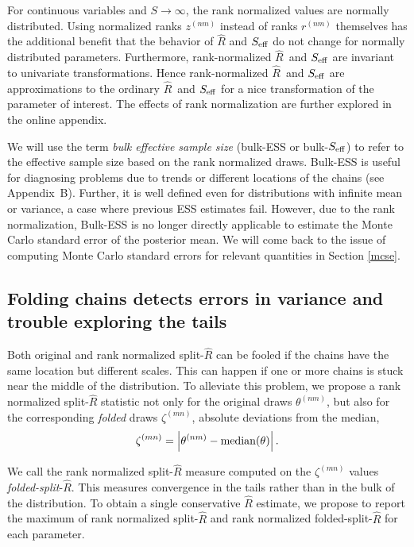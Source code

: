 \documentclass[american,]{article}
\newcommand{\Rhat}{$\widehat{R}$}
\theoremstyle{definition}
\begin{document}
For continuous variables and \(S \rightarrow \infty\), the rank
normalized values are normally distributed. Using normalized ranks
\(z^{(nm)}\) instead of ranks \(r^{(nm)}\) themselves has the additional
benefit that the behavior of \(\widehat{R}\) and \(S_{\rm eff}\) do
not change for normally distributed parameters.  Furthermore, rank-normalized \Rhat\ and \(S_{\rm eff}\) are invariant to univariate transformations. Hence    
rank-normalized \Rhat\ and \(S_{\rm eff}\) are approximations to the ordinary \Rhat\ and \(S_{\rm eff}\) for a nice transformation of the parameter of interest.
The effects of rank normalization are further explored in the online appendix.

We will use the term \emph{bulk effective sample size} (bulk-ESS or
bulk-\(S_{\rm eff}\)) to refer to the effective sample size based on the
rank normalized draws. Bulk-ESS is useful for diagnosing problems due to
trends or different locations of the chains (see Appendix~B). Further, it is
well defined even for distributions with infinite mean or variance, a
case where previous ESS estimates fail. However, due to the rank
normalization, Bulk-ESS is no longer directly applicable to estimate the
Monte Carlo standard error of the posterior mean. We will come back to
the issue of computing Monte Carlo standard errors for relevant
quantities in Section \ref{mcse}.

\hypertarget{diagnostics-for-folded-draws}{%
\subsection{Folding chains detects errors in variance and trouble exploring the tails}\label{diagnostics-for-folded-draws}}


Both original and rank normalized split-\(\widehat{R}\) can be
fooled if the chains have the same location but different scales. This
can happen if one or more chains is stuck near the middle of the distribution. 
To alleviate this problem, we propose a
rank normalized split-\(\widehat{R}\) statistic not only for the
original draws \(\theta^{(nm)}\), but also for the corresponding {\em folded}
draws \(\zeta^{(mn)}\), absolute deviations from the median,
\begin{equation}
\label{zeta}
\zeta^{(mn)} = \left|\theta^{(nm)}-{\rm median}(\theta)\right|.
\end{equation}

We call the rank normalized split-\(\widehat{R}\) measure computed on the
 \(\zeta^{(mn)}\) values  \emph{folded-split}-\(\widehat{R}\).
  This measures convergence in the
tails rather than in the bulk of the distribution. To obtain a single
conservative \(\widehat{R}\) estimate, we propose to report the maximum
of rank normalized split-\(\widehat{R}\) and rank normalized
folded-split-\(\widehat{R}\) for each parameter.
\end{document}
